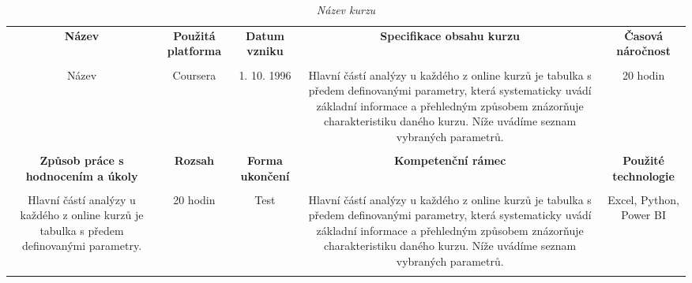 \begin{landscape}
\begin{table}[htbp]
  \renewcommand\thetable{1}
  \caption{\textit{Název kurzu}}\label{tab1}
  \scriptsize
  {
    \justifying
    \begin{tabularx}{\linewidth}{CCCCC}
      \toprule
     
      \textbf{Název} &
      \textbf{Použitá platforma} &
      \textbf{Datum vzniku} &
      \textbf{Specifikace obsahu kurzu} &
      \textbf{Časová náročnost}  \\
      
      \tabularnewline
      \midrule
      
        Název 
        &
        Coursera 
        &
        1. 10. 1996 
        &
        Hlavní částí analýzy u každého z online kurzů je tabulka s předem definovanými parametry, která systematicky uvádí základní informace a přehledným způsobem znázorňuje charakteristiku daného kurzu. Níže uvádíme seznam vybraných parametrů. 
        &
        20 hodin 
        \\
        
              \tabularnewline

      \toprule

        \textbf{Způsob práce s hodnocením a úkoly} &
        \textbf{Rozsah} &
        \textbf{Forma ukončení} &
        \textbf{Kompetenční rámec} &
        \textbf{Použité technologie} \\
      
        \tabularnewline
      \midrule
      
        Hlavní částí analýzy u každého z online kurzů je tabulka s předem definovanými parametry. 
        &
        20 hodin 
        &
        Test 
        &
Hlavní částí analýzy u každého z online kurzů je tabulka s předem definovanými parametry, která systematicky uvádí základní informace a přehledným způsobem znázorňuje charakteristiku daného kurzu. Níže uvádíme seznam vybraných parametrů.
        &
        Excel, Python, Power BI 
        \\

        \tabularnewline
      \bottomrule
    \end{tabularx}
  }
\end{table}
\end{landscape}